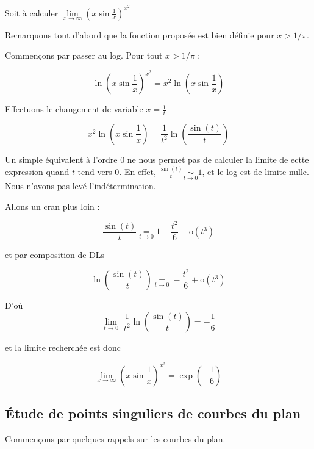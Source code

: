 \documentclass[12pt]{article}
\begin{document}
\begin{Exem}~

Soit à calculer $\underset{x\rightarrow \infty}{\lim} \left(x\sin\frac{1}{x}\right)^{x^2}$

Remarquons tout d'abord que la fonction proposée est bien définie pour $x >
1/\pi$.


Commençons par passer au log. Pour tout $x>1/\pi$ :

$$ \ln \left(x\sin\frac{1}{x}\right)^{x^2} = x^2 \ln(x\sin\frac{1}{x}) $$

Effectuons le changement de variable $x=\frac{1}{t}$

$$ x^2 \ln\left(x\sin\frac{1}{x}\right) = \frac{1}{t^2}\ln \left(\frac{\sin(t)}{t}\right)$$

Un simple équivalent à l'ordre 0 ne nous permet pas de calculer la limite
de ectte expression quand $t$ tend vers 0. En effet, $\frac{\sin(t)}{t}
\underset{t\rightarrow 0}{\sim} 1$, et le log est de limite nulle. Nous
n'avons pas levé l'indétermination.

Allons un cran plus loin :

$$\frac{\sin(t)}{t}\underset{t\rightarrow 0}{=} 1 - \frac{t^2}{6}
+\text{o}(t^3)$$

et par composition de DLs

$$\ln\left(\frac{\sin(t)}{t}\right)\underset{t\rightarrow 0}{=} - \frac{t^2}{6}
+\text{o}(t^3)$$

D'où $$\underset{t\rightarrow 0}{\lim}\; \frac{1}{t^2}\ln
\left(\frac{\sin(t)}{t}\right)=-\frac{1}{6}$$

et la limite recherchée est donc

$$\underset{x\rightarrow \infty}{\lim} \left(x\sin\frac{1}{x}\right)^{x^2}
= \exp\left(-\frac{1}{6}\right)$$




\end{Exem}

\subsection{Étude de points singuliers de courbes du plan}

Commençons par quelques rappels sur les courbes du plan.
\end{document}
